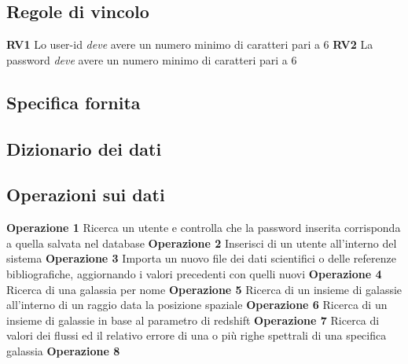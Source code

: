 \documentclass[12pt,a4paper,onecolumn]{article}
\begin{document}
	\subsection{Regole di vincolo}
	\begin{flushleft}
		\textbf{RV1} Lo user-id \textit{deve} avere un numero minimo di caratteri pari a 6\newline
		\textbf{RV2} La password \textit{deve} avere un numero minimo di caratteri pari a 6
	\end{flushleft}

	\subsection{Specifica fornita}


	\subsection{Dizionario dei dati}

	\subsection{Operazioni sui dati}
		\begin{flushleft}
			\textbf{Operazione 1} Ricerca un utente e controlla che la password inserita corrisponda a quella salvata nel database\newline
			\textbf{Operazione 2} Inserisci di un utente all'interno del sistema\newline
			\textbf{Operazione 3} Importa un nuovo file dei dati scientifici o delle referenze bibliografiche, aggiornando i valori precedenti con quelli nuovi\newline
			\textbf{Operazione 4} Ricerca di una galassia per nome\newline
			\textbf{Operazione 5} Ricerca di un insieme di galassie all'interno di un raggio data la posizione spaziale\newline
			\textbf{Operazione 6} Ricerca di un insieme di galassie in base al parametro di redshift\newline
			\textbf{Operazione 7} Ricerca di valori dei flussi ed il relativo errore di una o più righe spettrali di una specifica galassia\newline
			\textbf{Operazione 8}
		\end{flushleft}
\newpage
\end{document}
